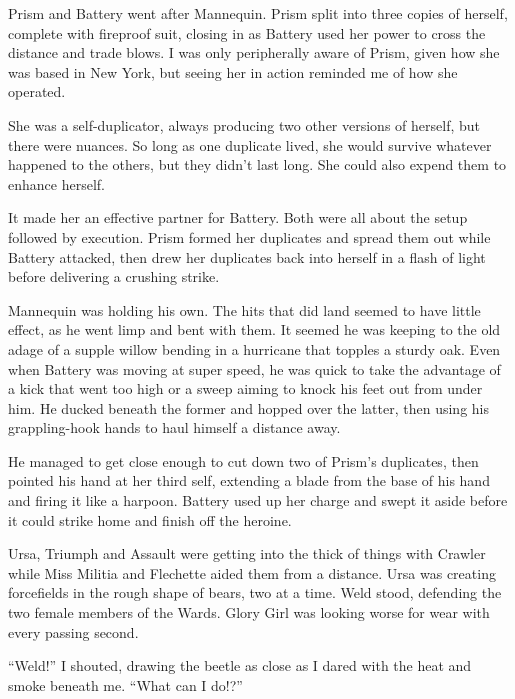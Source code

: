 Prism and Battery went after Mannequin.  Prism split into three copies of herself, complete with fireproof suit, closing in as Battery used her power to cross the distance and trade blows.  I was only peripherally aware of Prism, given how she was based in New York, but seeing her in action reminded me of how she operated.



She was a self-duplicator, always producing two other versions of herself, but there were nuances.  So long as one duplicate lived, she would survive whatever happened to the others, but they didn't last long.  She could also expend them to enhance herself.



It made her an effective partner for Battery.  Both were all about the setup followed by execution.  Prism formed her duplicates and spread them out while Battery attacked, then drew her duplicates back into herself in a flash of light before delivering a crushing strike.



Mannequin was holding his own.  The hits that did land seemed to have little effect, as he went limp and bent with them.  It seemed he was keeping to the old adage of a supple willow bending in a hurricane that topples a sturdy oak.  Even when Battery was moving at super speed, he was quick to take the advantage of a kick that went too high or a sweep aiming to knock his feet out from under him.  He ducked beneath the former and hopped over the latter, then using his grappling-hook hands to haul himself a distance away.



He managed to get close enough to cut down two of Prism's duplicates, then pointed his hand at her third self, extending a blade from the base of his hand and firing it like a harpoon.  Battery used up her charge and swept it aside before it could strike home and finish off the heroine.



Ursa, Triumph and Assault were getting into the thick of things with Crawler while Miss Militia and Flechette aided them from a distance.  Ursa was creating forcefields in the rough shape of bears, two at a time.  Weld stood, defending the two female members of the Wards.  Glory Girl was looking worse for wear with every passing second.



``Weld!''  I shouted, drawing the beetle as close as I dared with the heat and smoke beneath me.  ``What can I do!?''



